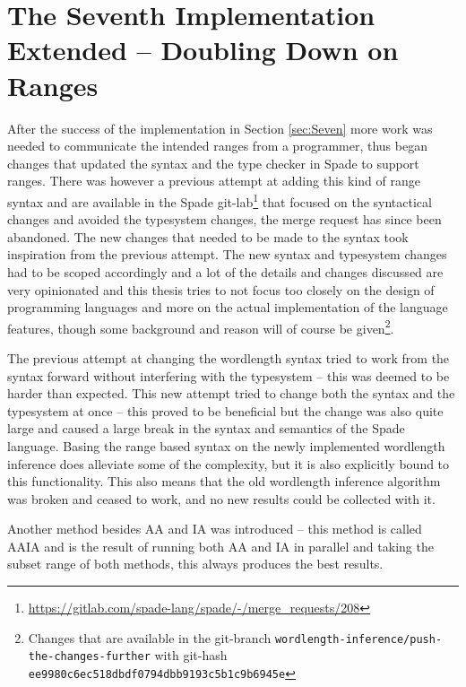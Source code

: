 \section{The Seventh Implementation Extended -- Doubling Down on Ranges}
\label{sec:Seven2}
After the success of the implementation in Section \ref{sec:Seven} more work was needed to communicate the intended ranges from a programmer, thus began changes that updated the syntax and the type checker in Spade to support ranges. There was however a previous attempt at adding this kind of range syntax and are available in the Spade git-lab\cprotect\footnote{\url{https://gitlab.com/spade-lang/spade/-/merge_requests/208}} that focused on the syntactical changes and avoided the typesystem changes, the merge request has since been abandoned. The new changes that needed to be made to the syntax took inspiration from the previous attempt.
The new syntax and typesystem changes had to be scoped accordingly and a lot of the details and changes discussed are very opinionated and this thesis tries to not focus too closely on the design of programming languages and more on the actual implementation of the language features, though some background and reason will of course be given\cprotect\footnote{Changes that are available in the git-branch \verb+wordlength-inference/push-the-changes-further+ with git-hash \verb+ee9980c6ec518dbdf0794dbb9193c5b1c9b6945e+}.

The previous attempt at changing the wordlength syntax tried to work from the syntax forward without interfering with the typesystem -- this was deemed to be harder than expected. This new attempt tried to change both the syntax and the typesystem at once -- this proved to be beneficial but the change was also quite large and caused a large break in the syntax and semantics of the Spade language. Basing the range based syntax on the newly implemented wordlength inference does alleviate some of the complexity, but it is also explicitly bound to this functionality. This also means that the old wordlength inference algorithm was broken and ceased to work, and no new results could be collected with it.

Another method besides AA and IA was introduced -- this method is called AAIA and is the result of running both AA and IA in parallel and taking the subset range of both methods, this always produces the best results.



